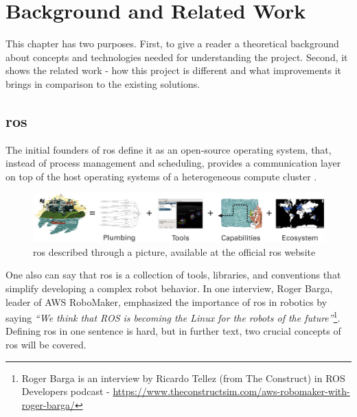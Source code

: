 \chapter{Background and Related Work}
\label{chap:background}

This chapter has two purposes.
First, to give a reader a theoretical background about concepts and technologies needed for understanding the project.
Second, it shows the related work - how this project is different and what improvements it brings in comparison to the existing solutions.

\section{\ac{ros}}

The initial founders of \ac{ros} define it as an open-source operating system, that, instead of process management and scheduling, provides a communication layer on top of the host operating systems of a heterogeneous compute cluster \cite{quigley_ros_nodate}.

\begin{figure}[H]
    \centering
    \includegraphics[width=\textwidth]{background/figures/ros_equation.png}
    \caption{\ac{ros} described through a picture, available at the official \ac{ros} website}
    \label{fig:background:ros_equation}
\end{figure}

One also can say that \ac{ros} is a collection of tools, libraries, and conventions that simplify developing a complex robot behavior.
In one interview, Roger Barga, leader of AWS RoboMaker, emphasized the importance of \ac{ros} in robotics by saying \textit{``We think that ROS is becoming the Linux for the robots of the future''}\footnote{Roger Barga is an interview by Ricardo Tellez (from The Construct) in ROS Developers podcast -    \url{https://www.theconstructsim.com/aws-robomaker-with-roger-barga/}}.
Defining \ac{ros} in one sentence is hard, but in further text, two crucial concepts of \ac{ros} will be covered.

